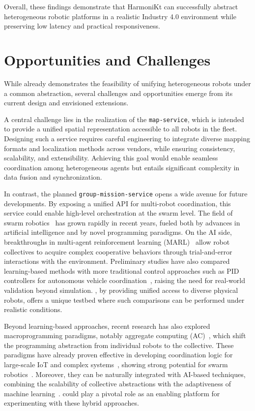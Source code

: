 \documentclass[conference]{IEEEtran}
\begin{document}
Overall, 
 these findings demonstrate that HarmoniKt can successfully abstract heterogeneous robotic platforms 
 in a realistic Industry 4.0 environment while preserving low latency and practical responsiveness. 

\section{Opportunities and Challenges}\label{sec:impact}

While \approach{} already demonstrates the feasibility of unifying 
 heterogeneous robots under a common abstraction, 
 several challenges and opportunities emerge from its current design and envisioned extensions.

A central challenge lies in the realization of the \texttt{map-service}, 
 which is intended to provide a unified spatial representation accessible to all robots in the fleet. 
% 
Designing such a service requires careful engineering to integrate diverse mapping formats 
 and localization methods across vendors, while ensuring consistency, scalability, and extensibility. 
% 
Achieving this goal would enable seamless coordination among heterogeneous agents 
 but entails significant complexity in data fusion and synchronization.

In contrast, 
 the planned \texttt{group-mission-service} opens a wide avenue for future developments. 
% 
By exposing a unified API for multi-robot coordination, 
 this service could enable high-level orchestration at the swarm level. 
% 
The field of swarm robotics~\cite{brambilla2013swarm} has grown rapidly in recent years, 
 fueled both by advances in artificial intelligence and by novel programming paradigms. 
% 
On the AI side, 
 breakthroughs in multi-agent reinforcement learning (MARL)~\cite{DBLP:journals/tsmc/BusoniuBS08,malucelli2025sac} 
 allow robot collectives to acquire complex cooperative behaviors 
 through trial-and-error interactions with the environment. 
% 
Preliminary studies have also compared learning-based methods with more traditional control approaches 
 such as PID controllers for autonomous vehicle coordination~\cite{DBLP:conf/smartcomp/BravettiBTAOG25}, 
 raising the need for real-world validation beyond simulation. 
% 
\approach{}, by providing unified access to diverse physical robots, 
 offers a unique testbed where such comparisons can be performed under realistic conditions.

Beyond learning-based approaches, 
 recent research has also explored macroprogramming paradigms, 
 notably aggregate computing (AC)~\cite{beal2015computer,cortecchia2024acsossymp}, 
 which shift the programming abstraction from individual robots to the collective. 
% 
These paradigms have already proven effective in developing coordination logic for large-scale IoT 
 and complex systems~\cite{cortecchia2024acsos},
 showing strong potential for swarm robotics~\cite{aguzzi2025lmcs,DBLP:conf/coordination/AguzziBBCCDFPV25}. 
% 
Moreover, they can be naturally integrated with AI-based techniques, 
 combining the scalability of collective abstractions with the adaptiveness 
 of machine learning~\cite{domini2024scp}. 
% 
\approach{} could play a pivotal role as an enabling platform for experimenting with these hybrid approaches.
\end{document}
